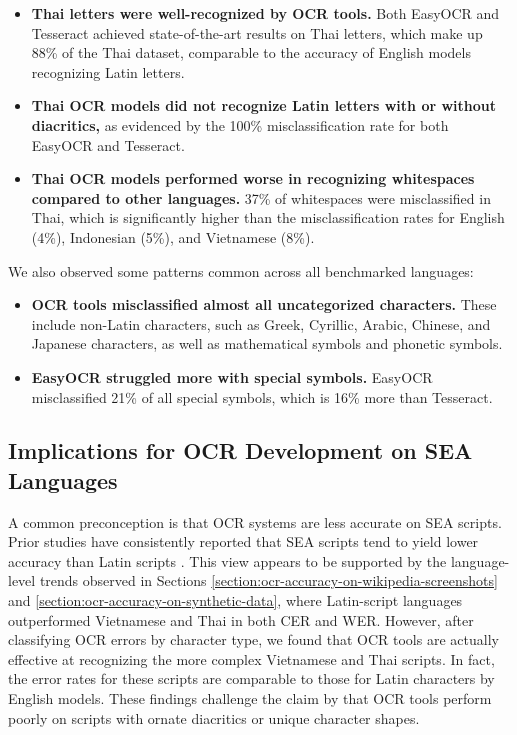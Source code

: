 \documentclass[12pt,oneside]{memoir}
\begin{document}
\begin{itemize}
    \item \textbf{Thai letters were well-recognized by OCR tools.} 
    Both EasyOCR and Tesseract achieved state-of-the-art results on Thai letters, which make up 88\% of the Thai dataset, comparable to the accuracy of English models recognizing Latin letters.
    \item \textbf{Thai OCR models did not recognize Latin letters with or without diacritics,} as evidenced by the 100\% misclassification rate for both EasyOCR and Tesseract.
    \item \textbf{Thai OCR models performed worse in recognizing whitespaces compared to other languages.} 37\% of whitespaces were misclassified in Thai, which is significantly higher than the misclassification rates for English (4\%), Indonesian (5\%), and Vietnamese (8\%).
\end{itemize}

We also observed some patterns common across all benchmarked languages:

\begin{itemize}
    \item \textbf{OCR tools misclassified almost all uncategorized characters.} These include non-Latin characters, such as Greek, Cyrillic, Arabic, Chinese, and Japanese characters, as well as mathematical symbols and phonetic symbols.
    \item \textbf{EasyOCR struggled more with special symbols.} EasyOCR misclassified 21\% of all special symbols, which is 16\% more than Tesseract.
\end{itemize}

\subsection{Implications for OCR Development on SEA Languages}

A common preconception is that OCR systems are less accurate on SEA scripts.
Prior studies have consistently reported that SEA scripts tend to yield lower accuracy than Latin scripts \parencite{ignat-etal-2022}.
This view appears to be supported by the language-level trends observed in Sections \ref{section:ocr-accuracy-on-wikipedia-screenshots} and \ref{section:ocr-accuracy-on-synthetic-data}, where Latin-script languages outperformed Vietnamese and Thai in both CER and WER.
However, after classifying OCR errors by character type, we found that OCR tools are actually effective at recognizing the more complex Vietnamese and Thai scripts. In fact, the error rates for these scripts are comparable to those for Latin characters by English models.
These findings challenge the claim by \textcite{agarwal-and-anastasopoulos-2024} that OCR tools perform poorly on scripts with ornate diacritics or unique character shapes.
\end{document}
